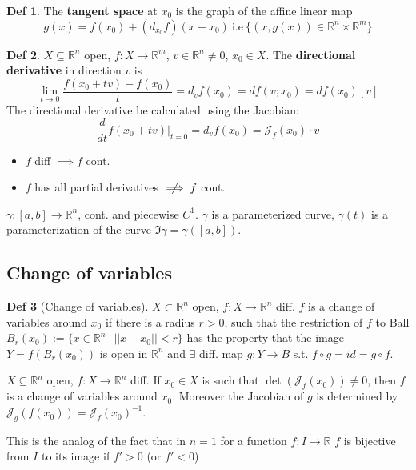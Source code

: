 \documentclass[a4paper, 10pt]{article}
\theoremstyle{definition}
\newtheorem*{definition}{Def}
\newcommand{\R}{\mathbb{R}}
\newcommand{\J}{\mathcal{J}}
\begin{document}
\begin{definition}
    The \textbf{tangent space} at \(x_0\) is the graph of the affine linear map
    \[g(x) = f(x_0) + (d_{x_0}f)(x - x_0) \ \text{i.e} \ \{(x, g(x)) \in \R^n \times \R^m\}\]
\end{definition}

\begin{definition}
    \(X \subseteq \R^n\) open, \(f: X \to \R^m\), \(v \in \R^n \neq 0\), \(x_0 \in X\). The \textbf{directional derivative} in direction \(v\) is
    \[\lim_{t \to 0} \frac{f(x_0 + tv) - f(x_0)}{t} = d_vf(x_0) = df(v;x_0) = df(x_0)[v]\]
    The directional derivative be calculated using the Jacobian:
    \[\frac{d}{dt} f(x_0 + tv) |_{t=0} = d_vf(x_0) = \J_f(x_0) \cdot v\]
\end{definition}

\begin{note*}[Summed up]
    \begin{itemize}
        \item \(f\) diff \(\implies f\) cont.
        \item \(f\) has all partial derivatives \(\centernot\implies f\) cont.
    \end{itemize}
\end{note*}

\begin{note*}
    \(\gamma: [a, b] \to \R^n\), cont. and piecewise \(C^1\). \(\gamma\) is a parameterized curve, \(\gamma(t)\) is a parameterization of the curve \(\Im \gamma = \gamma([a, b])\).
\end{note*}

\subsection{Change of variables}
\begin{definition}[Change of variables]
    \(X \subset \R^n\) open, \(f: X \to \R^n\) diff. \(f\) is a change of variables around \(x_0\) if there is a radius \(r > 0\), such that the restriction of \(f\) to Ball \(B_r(x_0) := \{x \in \R^n \ | \ ||x - x_0|| < r\}\) has the property that the image \(Y = f(B_r(x_0))\) is open in \(\R^n\) and \(\exists\) diff. map \(g: Y \to B\) s.t. \(f \circ g = id = g \circ f\).
\end{definition}

\begin{ntheorem*}
    \(X \subseteq \R^n\) open, \(f: X \to \R^n\) diff. If \(x_0 \in X\) is such that \(\det(\J_f(x_0)) \neq 0\), then \(f\) is a change of variables around \(x_0\). Moreover the Jacobian of \(g\) is determined by \(\J_g(f(x_0)) = \J_f(x_0)^{-1}\).

    This is the analog of the fact that in \(n = 1\) for a function \(f : I \to \R\) \(f\) is bijective from \(I\) to its image if \(f' > 0\) (or \(f' < 0\))
\end{ntheorem*}
\end{document}
